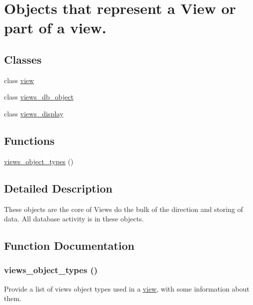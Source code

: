 \hypertarget{group__views__objects}{
\section{Objects that represent a View or part of a view.}
\label{group__views__objects}
}
\subsection*{Classes}
\begin{CompactItemize}
\item 
class \hyperlink{classview}{view}
\item 
class \hyperlink{classviews__db__object}{views\_\-db\_\-object}
\item 
class \hyperlink{classviews__display}{views\_\-display}
\end{CompactItemize}
\subsection*{Functions}
\begin{CompactItemize}
\item 
\hyperlink{group__views__objects_gd8249e4064daa263cdadc049caff2c95}{views\_\-object\_\-types} ()
\end{CompactItemize}


\subsection{Detailed Description}
These objects are the core of Views do the bulk of the direction and storing of data. All database activity is in these objects. 

\subsection{Function Documentation}
\hypertarget{group__views__objects_gd8249e4064daa263cdadc049caff2c95}{
\subsubsection[{views\_\-object\_\-types}]{\setlength{\rightskip}{0pt plus 5cm}views\_\-object\_\-types ()}}
\label{group__views__objects_gd8249e4064daa263cdadc049caff2c95}


Provide a list of views object types used in a \hyperlink{classview}{view}, with some information about them. 